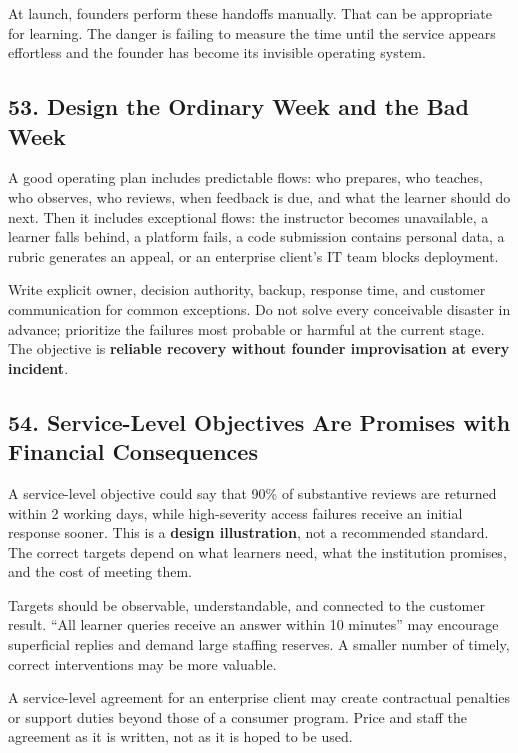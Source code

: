 At launch, founders perform these handoffs manually. That can be appropriate for learning. The danger is failing to measure the time until the service appears effortless and the founder has become its invisible operating system.

\subsection*{53. Design the Ordinary Week and the Bad Week}

A good operating plan includes predictable flows: who prepares, who teaches, who observes, who reviews, when feedback is due, and what the learner should do next. Then it includes exceptional flows: the instructor becomes unavailable, a learner falls behind, a platform fails, a code submission contains personal data, a rubric generates an appeal, or an enterprise client's IT team blocks deployment.

Write explicit owner, decision authority, backup, response time, and customer communication for common exceptions. Do not solve every conceivable disaster in advance; prioritize the failures most probable or harmful at the current stage. The objective is \textbf{reliable recovery without founder improvisation at every incident}.

\subsection*{54. Service-Level Objectives Are Promises with Financial Consequences}

A service-level objective could say that 90\% of substantive reviews are returned within 2 working days, while high-severity access failures receive an initial response sooner. This is a \textbf{design illustration}, not a recommended standard. The correct targets depend on what learners need, what the institution promises, and the cost of meeting them.

Targets should be observable, understandable, and connected to the customer result. ``All learner queries receive an answer within 10 minutes'' may encourage superficial replies and demand large staffing reserves. A smaller number of timely, correct interventions may be more valuable.

A service-level agreement for an enterprise client may create contractual penalties or support duties beyond those of a consumer program. Price and staff the agreement as it is written, not as it is hoped to be used.

